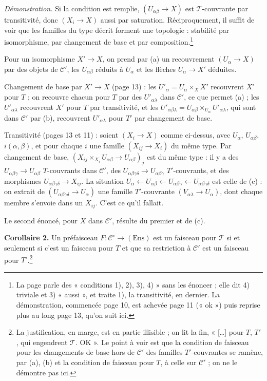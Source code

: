 \documentclass[11pt,a4paper]{article}
\begin{document}
\emph{Démonstration.} Si la condition est remplie, $(U_{\alpha\beta} \to X)$
est $\mathcal{T}$-couvrante par transitivité, donc $(X_i \to X)$ aussi par
saturation. Réciproquement, il suffit de voir que les familles du type décrit
forment une topologie : stabilité par isomorphisme, par changement de base et
par composition.\footnote{La page parle des « conditions 1), 2), 3), 4) » sans
les énoncer ; elle dit 4) triviale et 3) « aussi », et traite 1), la
transitivité, en dernier. La démonstration, commencée page 10, est achevée
page 11 (« ok ») puis reprise plus au long page 13, qu'on suit ici.}

Pour un isomorphisme $X' \to X$, on prend par (a) un recouvrement $(U_\alpha
\to X)$ par des objets de $\mathcal{C}'$, les $U_{\alpha\beta}$ réduits à
$U_\alpha$ et les flèches $U_\alpha \to X'$ déduites.

Changement de base par $X' \to X$ (page 13) : les $U'_\alpha = U_\alpha
\times_X X'$ recouvrent $X'$ pour $T$ ; on recouvre chacun pour $T$ par des
$U'_{\alpha\lambda}$ dans $\mathcal{C}'$, ce que permet (a) ; les
$U'_{\alpha\lambda}$ recouvrent $X'$ pour $T$ par transitivité, et les
$U'_{\alpha\beta\lambda} = U_{\alpha\beta} \times_{U_\alpha}
U'_{\alpha\lambda}$, qui sont dans $\mathcal{C}'$ par (b), recouvrent
$U'_{\alpha\lambda}$ pour $T'$ par changement de base.

Transitivité (pages 13 et 11) : soient $(X_i \to X)$ comme ci-dessus, avec
$U_\alpha$, $U_{\alpha\beta}$, $i(\alpha, \beta)$, et pour chaque $i$ une
famille $(X_{ij} \to X_i)$ du même type. Par changement de base, $(X_{ij}
\times_{X_i} U_{\alpha\beta} \to U_{\alpha\beta})_j$ est du même type : il y
a des $U_{\alpha\beta\gamma} \to U_{\alpha\beta}$ $T$-couvrants dans
$\mathcal{C}'$, des $U_{\alpha\beta\gamma\delta} \to U_{\alpha\beta\gamma}$
$T'$-couvrants, et des morphismes $U_{\alpha\beta\gamma\delta} \to X_{ij}$.
La situation $U_\alpha \leftarrow U_{\alpha\beta} \leftarrow
U_{\alpha\beta\gamma} \leftarrow U_{\alpha\beta\gamma\delta}$ est celle de
(c) : on extrait de $(U_{\alpha\beta\gamma\delta} \to U_\alpha)$ une famille
$T'$-couvrante $(V_{\alpha\lambda} \to U_\alpha)$, dont chaque membre s'envoie
dans un $X_{ij}$. C'est ce qu'il fallait.

Le second énoncé, pour $X$ dans $\mathcal{C}'$, résulte du premier et de (c).

\textbf{Corollaire 2.} Un préfaisceau $F : \mathcal{C}^{\circ} \to
(\mathrm{Ens})$ est un faisceau pour $\mathcal{T}$ si et seulement si c'est un
faisceau pour $T$ et que sa restriction à $\mathcal{C}'$ est un faisceau pour
$T'$.\footnote{La justification, en marge, est en partie illisible ; on lit la
fin, « […] pour $T$, $T'$, qui engendrent $\mathcal{T}$. OK ». Le point
à voir est que la condition de faisceau pour les changements de base hors de
$\mathcal{C}'$ des familles $T'$-couvrantes se ramène, par (a), (b) et la
condition de faisceau pour $T$, à celle sur $\mathcal{C}'$ ; on ne le
démontre pas ici.}
\end{document}
